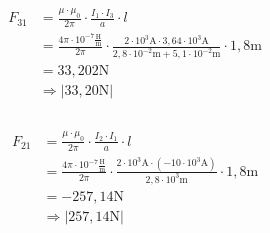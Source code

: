 \begin{enumerate}
        \begin{align*}
          F_{31} & =\frac{\mu\cdot\mu_{0}}{2\pi}\cdot\frac{I_{1}\cdot I_{3}}{a}\cdot l                                                                                                                         \\
                 & =\frac{4\pi\cdot 10^{-7}\frac{\text{H}}{\text{m}}}{2\pi}\cdot\frac{2\cdot 10^{3}\text{A}\cdot 3,64\cdot 10^{3}\text{A}}{2,8\cdot 10^{-2}\text{m}+5,1\cdot 10^{-2}\text{m}}\cdot 1,8\text{m} \\
                 & = 33,202\text{N}                                                                                                                                                                            \\
                 & \Rightarrow |33,20\text{N}|                                                                                                                                                                 \\                                                                                                                                                                 \\
        \end{align*}

        \begin{align*}
          F_{21} & =\frac{\mu\cdot\mu_{0}}{2\pi}\cdot\frac{I_{2}\cdot I_{1}}{a}\cdot l                                                                                               \\
                 & =\frac{4\pi\cdot 10^{-7}\frac{\text{H}}{\text{m}}}{2\pi}\cdot\frac{2\cdot 10^{3}\text{A}\cdot(-10\cdot 10^{3}\text{A})}{2,8\cdot 10^{3}\text{m}}\cdot 1,8\text{m} \\
                 & =-257,14\text{N}                                                                                                                                                  \\
                 & \Rightarrow |257,14\text{N}|                                                                                                                                      \\                                                                                                                                                              \\
        \end{align*}


\end{enumerate}
